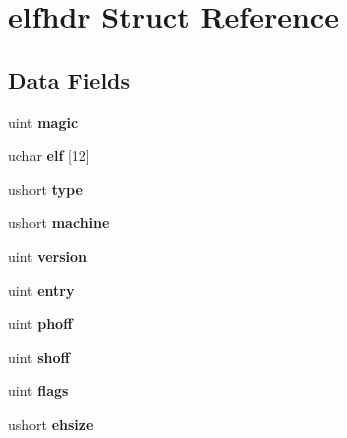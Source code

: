 \hypertarget{structelfhdr}{}\section{elfhdr Struct Reference}
\label{structelfhdr}
\subsection*{Data Fields}
\begin{DoxyCompactItemize}
\item 
uint {\bfseries magic}\hypertarget{structelfhdr_a28ee8116d69b533277311c5f3773b6b2}{}\label{structelfhdr_a28ee8116d69b533277311c5f3773b6b2}

\item 
uchar {\bfseries elf} \mbox{[}12\mbox{]}\hypertarget{structelfhdr_a22ec6f2383f0488ee18a18673398f201}{}\label{structelfhdr_a22ec6f2383f0488ee18a18673398f201}

\item 
ushort {\bfseries type}\hypertarget{structelfhdr_a2cd2eaf0c952e30f8196890787ef68fe}{}\label{structelfhdr_a2cd2eaf0c952e30f8196890787ef68fe}

\item 
ushort {\bfseries machine}\hypertarget{structelfhdr_a17113c58d39b044bb1ae78733a8c68fc}{}\label{structelfhdr_a17113c58d39b044bb1ae78733a8c68fc}

\item 
uint {\bfseries version}\hypertarget{structelfhdr_abb1c8274f47cfdbbcefe44af2d5c723d}{}\label{structelfhdr_abb1c8274f47cfdbbcefe44af2d5c723d}

\item 
uint {\bfseries entry}\hypertarget{structelfhdr_ad40755e1b2c6efc3ec0ad95889f743a5}{}\label{structelfhdr_ad40755e1b2c6efc3ec0ad95889f743a5}

\item 
uint {\bfseries phoff}\hypertarget{structelfhdr_a1d463f67fcf951c06cfaa37850004c51}{}\label{structelfhdr_a1d463f67fcf951c06cfaa37850004c51}

\item 
uint {\bfseries shoff}\hypertarget{structelfhdr_a465ccdf83d0e26d129d723a493a6e764}{}\label{structelfhdr_a465ccdf83d0e26d129d723a493a6e764}

\item 
uint {\bfseries flags}\hypertarget{structelfhdr_a2f1e0957c83938630ef0ed074830df03}{}\label{structelfhdr_a2f1e0957c83938630ef0ed074830df03}

\item 
ushort {\bfseries ehsize}\hypertarget{structelfhdr_aeffe5743cc720e5795af5d17b6fd6928}{}\label{structelfhdr_aeffe5743cc720e5795af5d17b6fd6928}


\end{DoxyCompactItemize}
